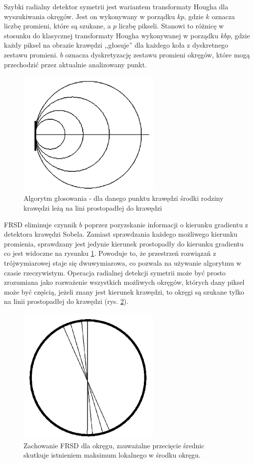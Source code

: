 Szybki radialny detektor symetrii jest wariantem transformaty Hougha dla wyszukiwania okręgów. Jest on wykonywany w porządku $kp$, gdzie $k$ oznacza liczbę promieni, które są szukane, a $p$ liczbę pikseli. Stanowi to różnicę w stosunku do klasycznej transformaty Hougha wykonywanej w porządku $kbp$, gdzie każdy piksel na obrazie krawędzi ,,głosuje'' dla każdego koła z dyskretnego zestawu promieni. $b$ oznacza dyskretyzację zestawu promieni okręgów, które mogą przechodzić przez aktualnie analizowany punkt.

\begin{figure}
  \centering
  \includegraphics[width=7cm]{img/fsrd1.png}
  \caption{Algorytm głosowania - dla danego punktu krawędzi środki rodziny krawędzi leżą na lini prostopadłej do krawędzi\cite{T2}}
  \label{fig:frsd1}
\end{figure}

FRSD eliminuje czynnik $b$ poprzez pozyzskanie informacji o kierunku gradientu z detektora krawędzi Sobela. Zamiast sprawdzania każdego możliwego kierunku promienia, sprawdzany jest jedynie kierunek prostopadły do kierunku gradientu co jest widoczne na rysunku \ref{fig:frsd1}. Powoduje to, że przestrzeń rozwiązań z trójwymiarowej staje się dwuwymiarowa, co pozwala na używanie algorytmu w czasie rzeczywistym. Operacja radialnej detekcji symetrii może być prosto zrozumiana jako rozważenie wszystkich możliwych okręgów, których dany piksel może być częścią, jeżeli znany jest kierunek krawędzi, to okręgi są szukane tylko na linii prostopadłej do krawędzi (rys. \ref{fig:frsd2}).

\begin{figure}
  \centering
  \includegraphics[width=7cm]{img/fsrd2.png}
  \caption{Zachowanie FRSD dla okręgu, zauważalne przecięcie średnic skutkuje istnieniem maksimum lokalnego w środku okręgu.\cite{T2}}
  \label{fig:frsd2}
\end{figure}

